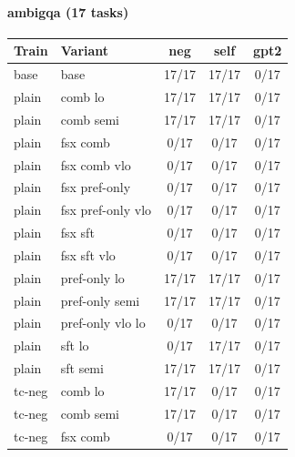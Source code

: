 \documentclass[10pt,landscape]{article}
\begin{document}
\paragraph{ambigqa (17 tasks)}
\begin{tabular}{llccc}
\toprule
Train & Variant & neg & self & gpt2 \\
\midrule
base & base & \cellcolor{done}17/17 & \cellcolor{done}17/17 & \cellcolor{missing}0/17 \\
plain & comb lo & \cellcolor{done}17/17 & \cellcolor{done}17/17 & \cellcolor{missing}0/17 \\
plain & comb semi & \cellcolor{done}17/17 & \cellcolor{done}17/17 & \cellcolor{missing}0/17 \\
plain & fsx comb & \cellcolor{missing}0/17 & \cellcolor{missing}0/17 & \cellcolor{missing}0/17 \\
plain & fsx comb vlo & \cellcolor{missing}0/17 & \cellcolor{missing}0/17 & \cellcolor{missing}0/17 \\
plain & fsx pref-only & \cellcolor{missing}0/17 & \cellcolor{missing}0/17 & \cellcolor{missing}0/17 \\
plain & fsx pref-only vlo & \cellcolor{missing}0/17 & \cellcolor{missing}0/17 & \cellcolor{missing}0/17 \\
plain & fsx sft & \cellcolor{missing}0/17 & \cellcolor{missing}0/17 & \cellcolor{missing}0/17 \\
plain & fsx sft vlo & \cellcolor{missing}0/17 & \cellcolor{missing}0/17 & \cellcolor{missing}0/17 \\
plain & pref-only lo & \cellcolor{done}17/17 & \cellcolor{done}17/17 & \cellcolor{missing}0/17 \\
plain & pref-only semi & \cellcolor{done}17/17 & \cellcolor{done}17/17 & \cellcolor{missing}0/17 \\
plain & pref-only vlo lo & \cellcolor{missing}0/17 & \cellcolor{missing}0/17 & \cellcolor{missing}0/17 \\
plain & sft lo & \cellcolor{missing}0/17 & \cellcolor{done}17/17 & \cellcolor{missing}0/17 \\
plain & sft semi & \cellcolor{done}17/17 & \cellcolor{done}17/17 & \cellcolor{missing}0/17 \\
tc-neg & comb lo & \cellcolor{done}17/17 & \cellcolor{missing}0/17 & \cellcolor{missing}0/17 \\
tc-neg & comb semi & \cellcolor{done}17/17 & \cellcolor{missing}0/17 & \cellcolor{missing}0/17 \\
tc-neg & fsx comb & \cellcolor{missing}0/17 & \cellcolor{missing}0/17 & \cellcolor{missing}0/17 \\

\end{tabular}
\end{document}
